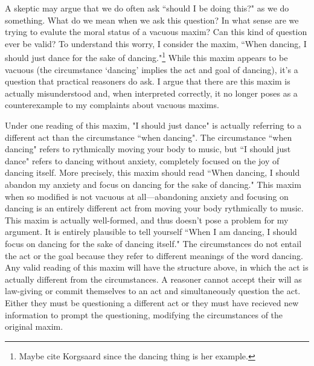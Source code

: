 \begin{isabellebody}
\begin{isamarkuptext}
A skeptic may argue that we do often ask ``should I be doing this?" as we do something. What do we mean when 
we ask this question? In what sense are we trying to evalute the moral status of a vacuous maxim?
Can this kind of question ever be valid? To understand this worry, I consider the maxim, 
``When dancing, I should just dance for the sake of dancing."\footnote{Maybe cite Korgsaard since the
dancing thing is her example.} While this maxim appears to be vacuous (the 
circumstance `dancing' implies the act and goal of dancing), it's a question that practical reasoners 
do ask. I argue that there are this maxim is actually misunderstood and, when interpreted correctly,
it no longer poses as a counterexample to my complaints about vacuous maxims.

Under one reading of this maxim, "I should just dance" is actually referring to a different act than the circumstance ``when dancing". 
The circumstance ``when dancing" refers 
to rythmically moving your body to music, but ``I should just dance" refers to dancing without anxiety, 
completely focused on the joy of dancing itself. More precisely, this maxim should read ``When 
dancing, I should abandon my anxiety and focus on dancing for the sake of dancing." This maxim when so 
modified is not vacuous at all—abandoning anxiety and focusing on dancing is an entirely different act 
from moving your body rythmically to music. This maxim is actually well-formed, and thus doesn't
pose a problem for my argument. It is entirely plausible to tell yourself ``When I am dancing, I should focus 
on dancing for the sake of dancing itself." The circumstances do not entail the act or the goal because 
they refer to different meanings of the word dancing. Any valid reading of this maxim will have the structure above, 
in which the act is actually different from the circumstances. A reasoner cannot accept their will 
as law-giving or commit themselves to an act and simultaneously question the act. Either they must be 
questioning a different act or they must have recieved new information to prompt the questioning, 
modifying the circumstances of the original maxim. 


\end{isamarkuptext}
\end{isabellebody}
